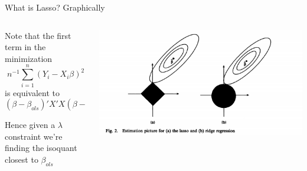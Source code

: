 \documentclass[notes,11pt, aspectratio=169]{beamer}
\newenvironment{wideitemize}{\itemize\addtolength{\itemsep}{10pt}}{\enditemize}
\begin{document}
\begin{frame}{What is Lasso? Graphically}
  \begin{columns}[T] %
    \begin{column}{.3\textwidth}
      \begin{wideitemize}
      \item Note that the first term in the  minimization
        $$n^{-1}\sum_{i=1}^{n}(Y_{i} - X_{i}\beta)^{2}$$
        is equivalent to
        $$(\beta- \beta_{ols})'X'X(\beta- \beta_{ols})+ C$$
      \item Hence given a $\lambda$ constraint we're finding the
        isoquant closest to $\beta_{ols}$
      \end{wideitemize}
    \end{column}%
  \hfill%
  \begin{column}{.7\textwidth}
    \includegraphics[width=\linewidth]{tibshiriani.png}
  \end{column}
\end{columns}
\end{frame}
\end{document}
